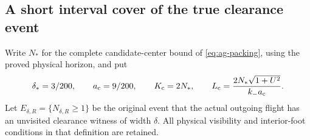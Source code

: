 \subsection{A short interval cover of the true clearance event}

Write $N_*$ for the complete candidate-center bound of
\eqref{eq:ag-packing}, using the proved physical horizon, and put
\begin{equation}\label{eq:lc-cover-constants}
 \delta_*=3/200,\qquad a_{\rm c}=9/200,\qquad
 K_{\rm c}=2N_*,\qquad
 L_{\rm c}=\frac{2N_*\sqrt{1+U^2}}{k_-a_{\rm c}}.
\end{equation}
Let $E_{\delta,R}=\{N_{\delta,R}\ge1\}$ be the original event that
the actual outgoing flight has an unvisited clearance witness of
width $\delta$.  All physical visibility and interior-foot conditions
in that definition are retained.

